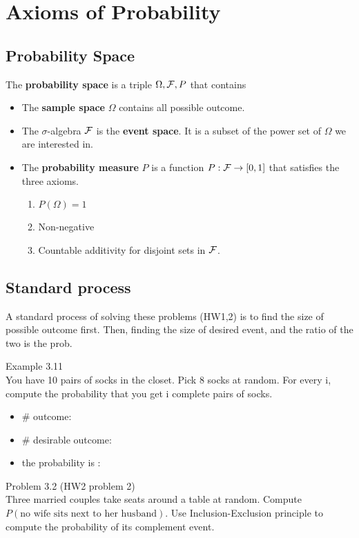 \section{Axioms of Probability}
\subsection{Probability Space}
The \textbf{probability space} is a triple \(\Omega,\mathcal{\MakeUppercase{f}},P\) that contains  
\begin{itemize}
	\item The \textbf{sample space} \(\Omega \) contains all possible outcome.  
	\item The \(\sigma\)-algebra \(\mathcal{\MakeUppercase{f}} \) is the \textbf{event space}. It is a subset of the power set of \(\Omega \) we are interested in. 
	\item The \textbf{probability measure} \(P\) is a function \(P:\mathcal{\MakeUppercase{f}} \to [0,1] \) that satisfies the three axioms. 
	\begin{enumerate}
		\item \(P(\Omega ) = 1\) 
		\item Non-negative
		\item Countable additivity for disjoint sets in \(\mathcal{\MakeUppercase{f}} \).  
	\end{enumerate}
\end{itemize}
\subsection{Standard process}
A standard process of solving these problems (HW1,2) is to find the size of possible outcome first. 
Then, finding the size of desired event, and the ratio of the two is the prob. 


\begin{eg}
	\cite{Gravner2021} Example 3.11\\
You have 10 pairs of socks in the closet. Pick 8 socks at random. For every i,
compute the probability that you get i complete pairs of socks.\\
\begin{itemize}
	\item \# outcome:
	\item \# desirable outcome:
	\item the probability is : 
\end{itemize}
\end{eg}
\begin{eg}
	\cite{Gravner2021} Problem 3.2 (HW2 problem 2)\\
	Three married couples take seats around a table at random. Compute \(P(\text{no wife sits next to her husband} )\). 
	Use Inclusion-Exclusion principle to compute the probability of its complement event. 
\end{eg}

